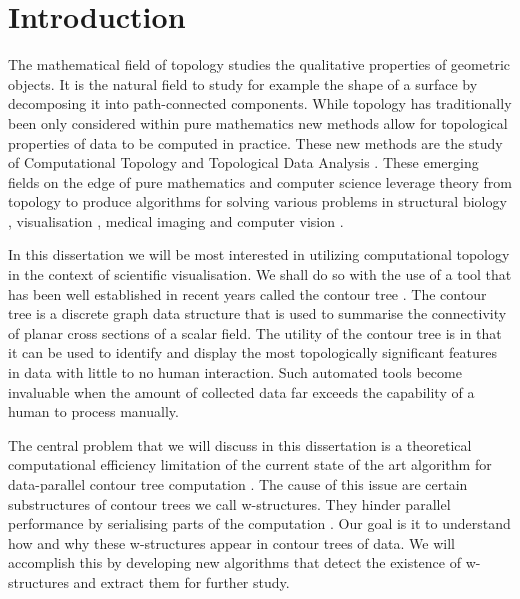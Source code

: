 \chapter{Introduction}
\label{chapter1}

The mathematical field of topology studies the qualitative properties of geometric objects. It is the natural field to study for example the shape of a surface by decomposing it into path-connected components. While topology has traditionally been only considered within pure mathematics new methods allow for topological properties of data to be computed in practice. These new methods are the study of Computational Topology \cite{topo-for-computing} and Topological Data Analysis \cite{topo-and-data}. These emerging fields on the edge of pure mathematics and computer science leverage theory from topology to produce algorithms for solving various problems in structural biology \cite{folded-molecules, hemo-globin}, visualisation \cite{topo-hierarchy, fiber-surfaces, flexible-isosurfaces}, medical imaging \cite{reeb-graph-brain} and
computer vision \cite{reeb-shape-analysis, structural-recognition}.

In this dissertation we will be most interested in utilizing computational topology in the context of scientific visualisation. We shall do so with the use of a tool that has been well established in recent years called the contour tree \cite{ct-big-paper}. The contour tree is a discrete graph data structure that is used to summarise the connectivity of planar cross sections of a scalar field. The utility of the contour tree is in that it can be used to identify and display the most topologically significant features in data with little to no human interaction. Such automated tools become invaluable when the amount of collected data far exceeds the capability of a human to process manually.

The central problem that we will discuss in this dissertation is a theoretical computational efficiency limitation of the current state of the art algorithm for data-parallel contour tree computation \cite{parallel-peak-pruning}. The cause of this issue are certain substructures of contour trees we call w-structures. They hinder parallel performance by serialising parts of the computation \cite{pathological-test-cases}. Our goal is it to understand how and why these w-structures appear in contour trees of data. We will accomplish this by developing new algorithms that detect the existence of w-structures and extract them for further study.

